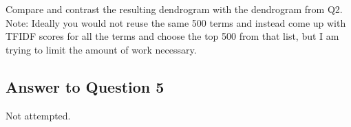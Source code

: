 \documentclass{article}
\begin{document}
Compare and contrast the resulting dendrogram with the dendrogram from Q2. \\

Note: Ideally you would not reuse the same 500 terms and instead come up with TFIDF scores for all the terms and choose the top 500 from that list, but I am trying to limit the amount of work necessary.

\subsection*{Answer to Question 5}

Not attempted.





\end{document}
